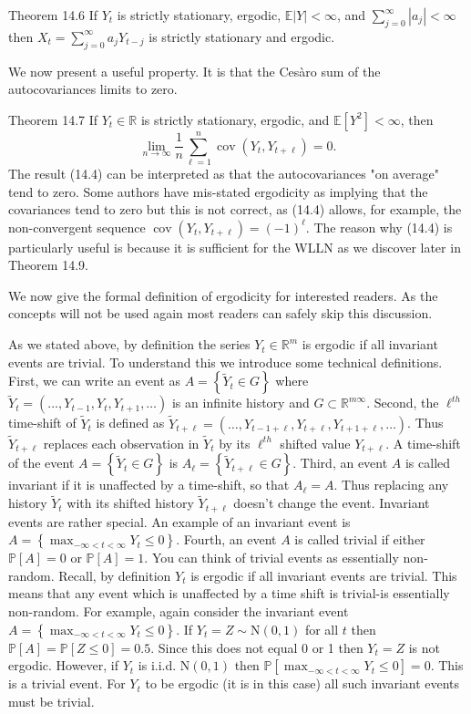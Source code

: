 \documentclass[10pt]{article}
\begin{document}
Theorem 14.6 If $Y_{t}$ is strictly stationary, ergodic, $\mathbb{E}|Y|<\infty$, and $\sum_{j=0}^{\infty}\left|a_{j}\right|<\infty$ then $X_{t}=\sum_{j=0}^{\infty} a_{j} Y_{t-j}$ is strictly stationary and ergodic.

We now present a useful property. It is that the Cesàro sum of the autocovariances limits to zero.

Theorem 14.7 If $Y_{t} \in \mathbb{R}$ is strictly stationary, ergodic, and $\mathbb{E}\left[Y^{2}\right]<\infty$, then
$$
\lim _{n \rightarrow \infty} \frac{1}{n} \sum_{\ell=1}^{n} \operatorname{cov}\left(Y_{t}, Y_{t+\ell}\right)=0 .
$$
The result (14.4) can be interpreted as that the autocovariances "on average" tend to zero. Some authors have mis-stated ergodicity as implying that the covariances tend to zero but this is not correct, as (14.4) allows, for example, the non-convergent sequence $\operatorname{cov}\left(Y_{t}, Y_{t+\ell}\right)=(-1)^{\ell}$. The reason why (14.4) is particularly useful is because it is sufficient for the WLLN as we discover later in Theorem 14.9.

We now give the formal definition of ergodicity for interested readers. As the concepts will not be used again most readers can safely skip this discussion.

As we stated above, by definition the series $Y_{t} \in \mathbb{R}^{m}$ is ergodic if all invariant events are trivial. To understand this we introduce some technical definitions. First, we can write an event as $A=\left\{\widetilde{Y}_{t} \in G\right\}$ where $\widetilde{Y}_{t}=\left(\ldots, Y_{t-1}, Y_{t}, Y_{t+1}, \ldots\right)$ is an infinite history and $G \subset \mathbb{R}^{m \infty}$. Second, the $\ell^{t h}$ time-shift of $\widetilde{Y}_{t}$ is defined as $\widetilde{Y}_{t+\ell}=\left(\ldots, Y_{t-1+\ell}, Y_{t+\ell}, Y_{t+1+\ell}, \ldots\right)$. Thus $\widetilde{Y}_{t+\ell}$ replaces each observation in $\widetilde{Y}_{t}$ by its $\ell^{t h}$ shifted value $Y_{t+\ell}$. A time-shift of the event $A=\left\{\widetilde{Y}_{t} \in G\right\}$ is $A_{\ell}=\left\{\widetilde{Y}_{t+\ell} \in G\right\}$. Third, an event $A$ is called invariant if it is unaffected by a time-shift, so that $A_{\ell}=A$. Thus replacing any history $\widetilde{Y}_{t}$ with its shifted history $\widetilde{Y}_{t+\ell}$ doesn't change the event. Invariant events are rather special. An example of an invariant event is $A=\left\{\max _{-\infty<t<\infty} Y_{t} \leq 0\right\}$. Fourth, an event $A$ is called trivial if either $\mathbb{P}[A]=0$ or $\mathbb{P}[A]=1$. You can think of trivial events as essentially non-random. Recall, by definition $Y_{t}$ is ergodic if all invariant events are trivial. This means that any event which is unaffected by a time shift is trivial-is essentially non-random. For example, again consider the invariant event $A=\left\{\max _{-\infty<t<\infty} Y_{t} \leq 0\right\}$. If $Y_{t}=Z \sim \mathrm{N}(0,1)$ for all $t$ then $\mathbb{P}[A]=\mathbb{P}[Z \leq 0]=0.5$. Since this does not equal 0 or 1 then $Y_{t}=Z$ is not ergodic. However, if $Y_{t}$ is i.i.d. $\mathrm{N}(0,1)$ then $\mathbb{P}\left[\max _{-\infty<t<\infty} Y_{t} \leq 0\right]=0$. This is a trivial event. For $Y_{t}$ to be ergodic (it is in this case) all such invariant events must be trivial.
\end{document}
